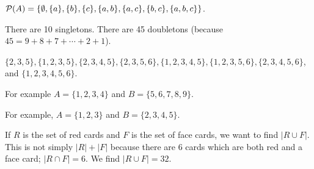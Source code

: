 \documentclass[11pt]{exam}
\renewenvironment{Ans}[1]{\setcounter{question}{#1}\addtocounter{question}{-1}\question }{}
\begin{document}
\begin{questions}
\begin{Ans}{12}
  
\end{Ans}
\begin{Ans}{13}
    $\mathcal P(A) = \{\emptyset, \{a\}, \{b\}, \{c\}, \{a,b\}, \{a,c\}, \{b,c\}, \{a,b,c\}\}$.
  
\end{Ans}
\begin{Ans}{14}
      There are 10 singletons.  There are 45 doubletons (because $45 = 9+8+7+\cdots+2+1$).
  
\end{Ans}
\begin{Ans}{15}
      $\{2,3,5\}, \{1,2,3,5\}, \{2,3,4,5\}, \{2,3,5,6\}, \{1,2,3,4,5\}, \{1,2,3,5,6\}, \{2,3,4,5,6\}$, and $\{1,2,3,4,5,6\}$.
  
\end{Ans}
\begin{Ans}{16}
   For example $A = \{1,2,3,4\}$ and $B = \{5,6,7,8,9\}$.
  
\end{Ans}
\begin{Ans}{17}
    For example, $A = \{1,2,3\}$ and $B = \{2,3,4,5\}$.
  
\end{Ans}
\begin{Ans}{18}
      If $R$ is the set of red cards and $F$ is the set of face cards, we want to find $|R \cup F|$.  This is not simply $|R| + |F|$ because there are 6 cards which are both red and a face card; $|R \cap F| = 6$.  We find $|R \cup F| = 32$.
  
\end{Ans}
 \end{questions} \par 
\end{document}
